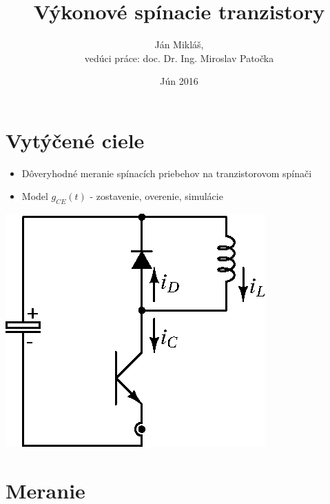 \documentclass[oneside]{article}
\begin{document}
\author{Ján Mikláš,\\vedúci práce: doc. Dr. Ing. Miroslav Patočka}
\date{Jún 2016}
\title{\vspace{60pt}Výkonové spínacie tranzistory}
\maketitle


\newpage
\tableofcontents

\newpage
\section{Vytýčené ciele}
\begin{itemize}
    \item Dôveryhodné meranie spínacích priebehov na tranzistorovom spínači
    \item Model $g_{CE}(t)$ - zostavenie, overenie, simulácie
\end{itemize}

{\centering \includegraphics[scale=.8]{obr/tranzistorovy_spinac} \par}

\newpage
{\centering \section{Meranie} \label{sec:meranie} \par}

\end{document}
